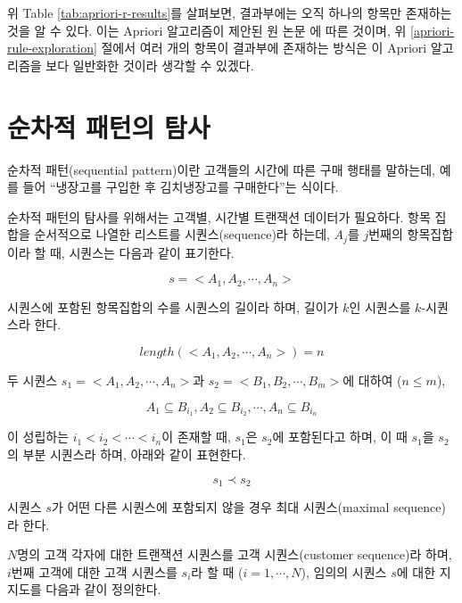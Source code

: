 \documentclass[]{book}
\begin{document}
위 Table \ref{tab:apriori-r-results}를 살펴보면, 결과부에는 오직 하나의 항목만 존재하는 것을 알 수 있다. 이는 Apriori 알고리즘이 제안된 원 논문 \citep{agrawal1993mining}에 따른 것이며, 위 \ref{apriori-rule-exploration} 절에서 여러 개의 항목이 결과부에 존재하는 방식은 이 Apriori 알고리즘을 보다 일반화한 것이라 생각할 수 있겠다.

\hypertarget{association-sequential-pattern}{%
\section{순차적 패턴의 탐사}\label{association-sequential-pattern}}

순차적 패턴(sequential pattern)이란 고객들의 시간에 따른 구매 행태를 말하는데, 예를 들어 ``냉장고를 구입한 후 김치냉장고를 구매한다''는 식이다.

순차적 패턴의 탐사를 위해서는 고객별, 시간별 트랜잭션 데이터가 필요하다. 항목 집합을 순서적으로 나열한 리스트를 시퀀스(sequence)라 하는데, \(A_j\)를 \(j\)번째의 항목집합이라 할 때, 시퀀스는 다음과 같이 표기한다.

\begin{equation*}
s = < A_1, A_2, \cdots, A_n >
\end{equation*}

시퀀스에 포함된 항목집합의 수를 시퀀스의 길이라 하며, 길이가 \(k\)인 시퀀스를 \(k\)-시퀀스라 한다.

\begin{equation*}
length(< A_1, A_2, \cdots, A_n >) = n
\end{equation*}

두 시퀀스 \(s_1 = < A_1, A_2, \cdots, A_n >\)과 \(s_2 = < B_1, B_2, \cdots, B_m >\)에 대하여 (\(n \leq m\)),

\begin{equation*}
A_1 \subseteq B_{i_1}, A_2 \subseteq B_{i_2}, \cdots,  A_n \subseteq B_{i_n}
\end{equation*}

이 성립하는 \(i_1 < i_2 < \cdots < i_n\)이 존재할 때, \(s_1\)은 \(s_2\)에 포함된다고 하며, 이 때 \(s_1\)을 \(s_2\)의 부분 시퀀스라 하며, 아래와 같이 표현한다.

\begin{equation*}
s_1 \prec s_2
\end{equation*}

시퀀스 \(s\)가 어떤 다른 시퀀스에 포함되지 않을 경우 최대 시퀀스(maximal sequence)라 한다.

\(N\)명의 고객 각자에 대한 트랜잭션 시퀀스를 고객 시퀀스(customer sequence)라 하며, \(i\)번째 고객에 대한 고객 시퀀스를 \(s_i\)라 할 때 (\(i = 1, \cdots, N\)), 임의의 시퀀스 \(s\)에 대한 지지도를 다음과 같이 정의한다.
\end{document}
